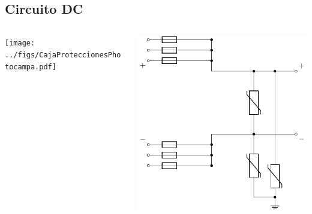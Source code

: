 \documentclass[aspectratio=169, usenames,svgnames,dvipsnames]{beamer}
\begin{document}
\subsection{Circuito DC}
\label{sec:orge2c3c93}
\begin{frame}[label={sec:orga86ad96}]{}
\begin{columns}
\begin{column}{0.4\columnwidth}
\begin{center}
\texttt{[image: ../figs/CajaProteccionesPhotocampa.pdf]}
\end{center}
\end{column}

\begin{column}{0.6\columnwidth}
\begin{center}
\includegraphics[height=0.8\textheight]{../figs/proteccionesDC.pdf}
\end{center}
\end{column}
\end{columns}
\end{frame}
\end{document}
